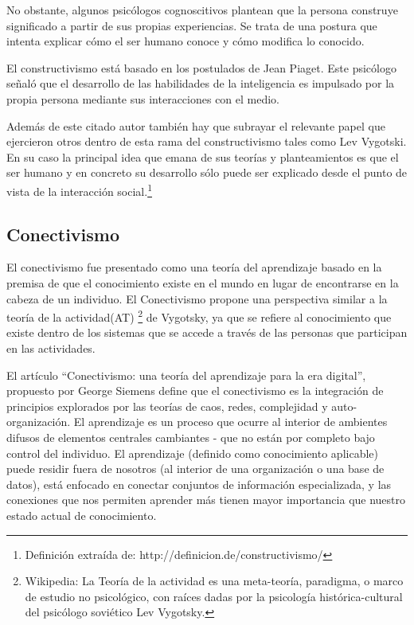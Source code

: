 No obstante, algunos psicólogos cognoscitivos plantean que la persona construye
significado a partir de sus propias experiencias. Se trata de una postura que
intenta explicar cómo el ser humano conoce y cómo modifica lo
conocido\cite{Rojas}.

El constructivismo está basado en los postulados de Jean Piaget. Este psicólogo
señaló que el desarrollo de las habilidades de la inteligencia es impulsado por
la propia persona mediante sus interacciones con el medio.

Además de este citado autor también hay que subrayar el relevante papel que
ejercieron otros dentro de esta rama del constructivismo tales como Lev
Vygotski. En su caso la principal idea que emana de sus teorías y 
planteamientos es que el ser humano y en concreto su desarrollo sólo puede ser
explicado desde el punto de vista de la interacción social.\footnote{Definición
extraída de: http://definicion.de/constructivismo/}


\subsection{Conectivismo}

El conectivismo fue presentado como una teoría del aprendizaje basado en la
premisa de que el conocimiento existe en el mundo en lugar de encontrarse en la
cabeza de un individuo. El Conectivismo propone una perspectiva similar a la
teoría de la actividad(AT) \footnote{Wikipedia: La Teoría de la actividad es
una meta-teoría, paradigma, o marco de estudio no psicológico, con raíces dadas
por la psicología histórica-cultural del psicólogo soviético Lev Vygotsky.}
de Vygotsky, ya que se refiere al conocimiento que existe dentro de los sistemas
que se accede a través de las personas que participan en las actividades.

El artículo “Conectivismo: una teoría del aprendizaje para la era digital”,
propuesto por George Siemens define que el conectivismo es la integración de
principios explorados por las teorías de caos, redes, complejidad y auto-
organización. El aprendizaje es un proceso que ocurre al interior de ambientes
difusos de elementos centrales cambiantes - que no están por completo bajo
control del individuo. El aprendizaje (definido como conocimiento aplicable)
puede residir fuera de nosotros (al interior de una organización o una base de
datos), está enfocado en conectar conjuntos de información especializada, y las
conexiones que nos permiten aprender más tienen mayor importancia que nuestro
estado actual de conocimiento.

